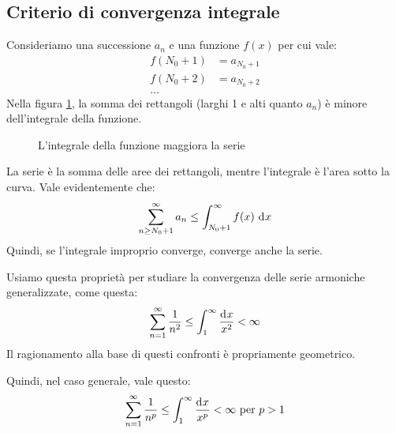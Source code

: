 \subsection{Criterio di convergenza integrale}
\label{sec:criterio_convergenza_integrale}

Consideriamo una successione $a_n$ e una funzione $f(x)$ per cui vale:
\begin{align*}
f(N_0 + 1) &= a_{N_0 + 1} \\
f(N_0 + 2) &= a_{N_0 + 2} \\
\ldots 
\end{align*}
Nella figura \ref{fig:integrale_maggiora_serie}, la somma dei rettangoli (larghi 1 e alti quanto $a_n$) \`e minore dell'integrale della funzione.

\begin{figure}
\centering
{}
\caption{\label{fig:integrale_maggiora_serie}L'integrale della funzione maggiora la serie}
\end{figure}

La serie \`e la somma delle aree dei rettangoli, mentre l'integrale \`e l'area sotto la curva. Vale evidentemente che:
\[
\sum_{n \ge N_0 + 1}^{\infty} a_n \le \int_{N_0 + 1}^{\infty} f(x) \dx
\]
Quindi, se l'integrale improprio converge, converge anche la serie.

Usiamo questa propriet\`a per studiare la convergenza delle serie armoniche generalizzate, come questa:
\[
\sum_{n = 1}^{\infty} \frac{1}{n^2} \le \int_{1}^{\infty} \frac{\diff x}{x^2} < \infty
\]
Il ragionamento alla base di questi confronti \`e propriamente geometrico. 

Quindi, nel caso generale, vale questo:
\[
\sum_{n = 1}^{\infty} \frac{1}{n^p} \le \int_{1}^{\infty} \frac{\diff x}{x^p} < \infty \text{ per } p > 1
\]

